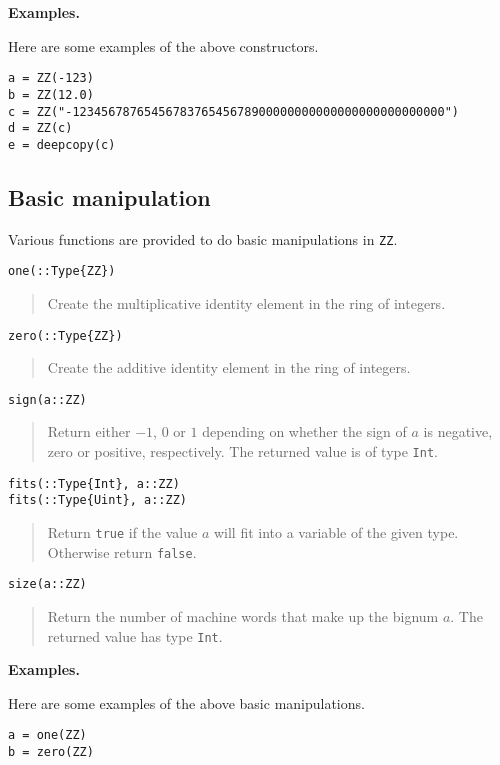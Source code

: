 \documentclass[a4paper,10pt]{article}
\newcommand{\code}{\lstinline}
\newcommand{\desc}[1]{\vspace{-3mm}\begin{quote}#1\end{quote}}
\begin{document}
{\textbf{Examples.}

Here are some examples of the above constructors.

\begin{lstlisting}
a = ZZ(-123)
b = ZZ(12.0)
c = ZZ("-1234567876545678376545678900000000000000000000000000")
d = ZZ(c)
e = deepcopy(c)
\end{lstlisting}

\subsection{Basic manipulation}

Various functions are provided to do basic manipulations in \code{ZZ}.

\begin{lstlisting}
one(::Type{ZZ})
\end{lstlisting}

\desc{Create the multiplicative identity element in the ring of integers.}

\begin{lstlisting}
zero(::Type{ZZ})
\end{lstlisting}

\desc{Create the additive identity element in the ring of integers.}

\begin{lstlisting}
sign(a::ZZ)
\end{lstlisting}

\desc{Return either $-1$, $0$ or $1$ depending on whether the sign of $a$ is negative,
zero or positive, respectively. The returned value is of type \code{Int}.}

\begin{lstlisting}
fits(::Type{Int}, a::ZZ)
fits(::Type{Uint}, a::ZZ)
\end{lstlisting}

\desc{Return \code{true} if the value $a$ will fit into a variable of the given
type. Otherwise return \code{false}.}

\begin{lstlisting}
size(a::ZZ)
\end{lstlisting}

\desc{Return the number of machine words that make up the bignum $a$. The
returned value has type \code{Int}.}

\textbf{Examples.}

Here are some examples of the above basic manipulations.

\begin{lstlisting}
a = one(ZZ)
b = zero(ZZ)


\end{lstlisting}}
\end{document}
